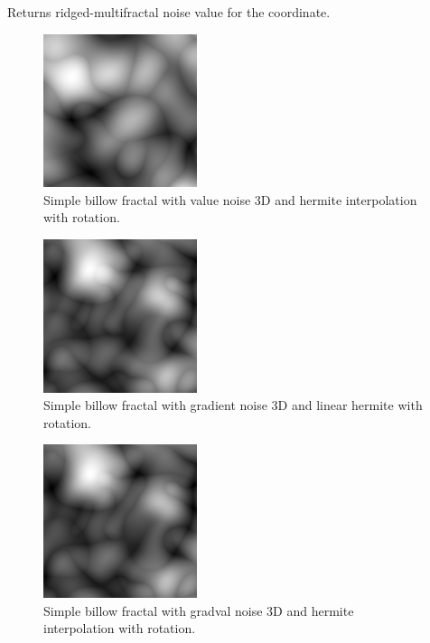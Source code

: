 Returns ridged-multifractal noise value for the coordinate.

\begin{figure}[h]
\centering
\includegraphics[width=0.4\textwidth]{out/simpleBillow3/simpleBillow3_value_noise3D_hermiteInterp_rot.png}
\caption{Simple billow fractal with value noise 3D and hermite interpolation with rotation.}
\label{fig:simple_billow3_value_noise3D_hermiteInterp_rot}
\end{figure}

\begin{figure}[h]
\centering
\includegraphics[width=0.4\textwidth]{out/simpleBillow3/simpleBillow3_gradient_noise3D_hermiteInterp_rot.png}
\caption{Simple billow fractal with gradient noise 3D and linear hermite with rotation.}
\label{fig:simple_billow3_gradient_noise3D_hermiteInterp_rot}
\end{figure}

\begin{figure}[h]
\centering
\includegraphics[width=0.4\textwidth]{out/simpleBillow3/simpleBillow3_gradval_noise3D_hermiteInterp_rot.png}
\caption{Simple billow fractal with gradval noise 3D and hermite interpolation with rotation.}
\label{fig:simple_billow3_gradval_noise3D_hermiteInterp_rot}
\end{figure}

